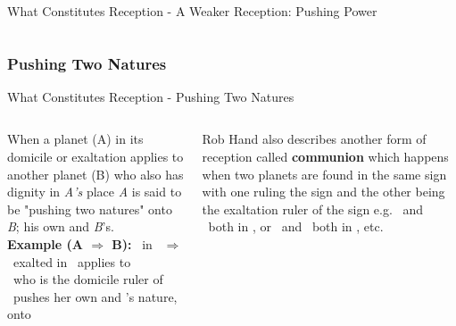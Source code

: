 \begin{frame}[t]{What Constitutes Reception - A Weaker Reception: Pushing Power}
\begin{columns}[T, onlytextwidth]
\end{columns}
\vspace{0.2cm}
\end{frame}
\subsubsection{Pushing Two Natures}
\begin{frame}[t]{What Constitutes Reception - Pushing Two Natures}
\begin{columns}[T, onlytextwidth]
When a planet (A) in its domicile or exaltation applies to another planet (B) who also has dignity in \textsl{A's} place \textsl{A} is said to be "pushing two natures" onto \textsl{B}; his own and \textsl{B}'s.\footnotemark[1]\\
\vspace{0.2cm}
\textbf{Example (A $\Rightarrow$ B):} \Venus\ in \Pisces\ $\Rightarrow$ \Jupiter \\
\ul
\Venus\ exalted in \Pisces\ applies to \\
\Jupiter\ who is the domicile ruler of \Pisces \\
\Venus\ pushes her own and \Jupiter's nature, onto \Jupiter \\
\vspace{0.2cm}

Rob Hand also describes another form of reception called \textbf{communion} which happens when two planets are found in the same sign with one ruling the sign and the other being the exaltation ruler of the sign e.g. \Moon\ and \Jupiter\ both in \Cancer, or \Mars\ and \Sun\ both in \Aries, etc.


\end{columns}
\end{frame}
